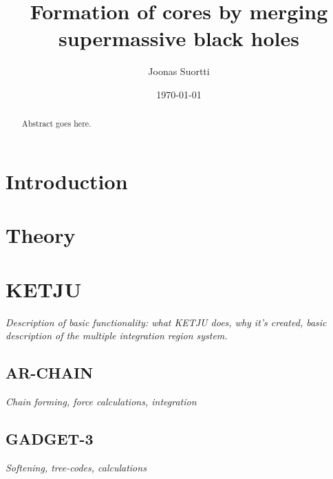 \documentclass[english, oneside]{HYgradu}
\title{Formation of cores by merging supermassive black holes}
\author{Joonas Suortti}
\date{\today}
\begin{document}
\maketitle

\begin{abstract}
Abstract goes here.
\end{abstract}

\mytableofcontents



\chapter{Introduction}

\chapter{Theory}



\chapter{KETJU}

\textit{Description of basic functionality: what KETJU does, why it's created, basic description of the multiple integration region system.} 

\section{AR-CHAIN}

\textit{Chain forming, force calculations, integration}

\section{GADGET-3}

\textit{Softening, tree-codes, calculations}
\end{document}
